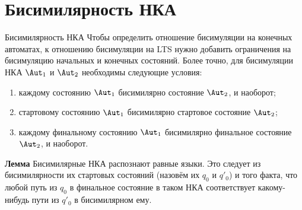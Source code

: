 \section{Бисимилярность НКА}
\begin{frame}{Бисимилярность НКА}
\footnotesize Чтобы определить отношение бисимуляции на конечных автоматах, к отношению бисимуляции на LTS нужно добавить ограничения на бисимуляцию начальных и конечных состояний. Более точно, для бисимуляции НКА $\Aut_1$ и $\Aut_2$ необходимы следующие условия: %
\begin{enumerate}
\item каждому состоянию $\Aut_1$ бисимилярно состояние $\Aut_2$, и наоборот;
\item стартовому состоянию $\Aut_1$ бисимилярно стартовое состояние $\Aut_2$;
\item каждому финальному состоянию $\Aut_1$ бисимилярно финальное состояние $\Aut_2$, и наоборот.
\end{enumerate} %

\begin{exampleblock}{\bf Лемма}
Бисимилярные НКА распознают равные языки. Это следует из бисимилярности их стартовых состояний (назовём их $q_0$ и $q'_0$) и того факта, что любой путь из $q_0$ в финальное состояние в таком НКА соответствует какому-нибудь пути из $q'_0$ в бисимилярном ему.
\end{exampleblock} %

\end{frame}

